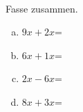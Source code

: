 \begin{aufgabe} ~ \\ 
Fasse zusammen.\begin{multicols}{2} 
\begin{enumerate}[a)] 
\item 
$9x+2x$=
\item 
$6x+1x$=
\item 
$2x-6x$=
\item 
$8x+3x$=
\end{enumerate} 
\end{multicols} 
\end{aufgabe} 
